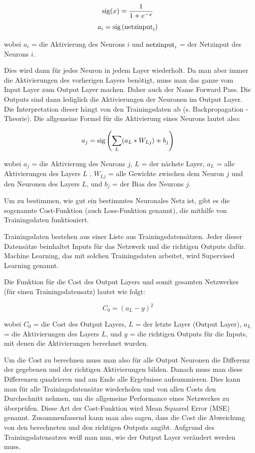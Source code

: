\documentclass{scrartcl}
\begin{document}
	{\Large
	\[
		\textrm{sig}(x)=\frac{1}{1+e^{-x}}
		\]
	\[
		a_i=\textrm{sig}\left({\textrm{netzinput}}_i \right)
		\]}
	
	wobei $a_i$ = die Aktivierung des Neurons $i$ und $\textrm{netzinput}_{i}$ = der Netzinput des Neurons $i$.

	Dies wird dann für jedes Neuron in jedem Layer wiederholt. Da man aber immer die Aktivierungen des vorherigen Layers benötigt, muss man das ganze vom Input Layer zum Output Layer machen. Daher auch der Name Forward Pass. Die Outputs sind dann lediglich die Aktivierungen der Neuronen im Output Layer. Die Interpretation dieser hängt von den Trainingsdaten ab (s. Backpropagation - Theorie). Die allgemeine Formel für die Aktivierung eines Neurons lautet also: 

	{\Large \[
		a_{j} = \textrm{sig}\left(\sum_{L} (a_{L} * W_{Lj}) + b_{j}\right)
		\]}
		
	\noindent wobei $a_j$ = die Aktivierung des Neurons $j$, $L$ = der nächste Layer, $a_L$ = alle Aktivierungen des Layers $L$ , $W_{Lj}$ = alle Gewichte zwischen dem Neuron $j$ und den Neuronen des Layers $L$, und $b_j$ = der Bias des Neurons $j$. \cite{brotcrunsher:forwardpass}
	

	Um zu bestimmen, wie gut ein bestimmtes Neuronales Netz ist, gibt es die sogenannte Cost-Funktion (auch Loss-Funktion genannt), die mithilfe von Trainingsdaten funktioniert.
	
	Trainingsdaten bestehen aus einer Liste aus Trainingsdatensätzen. Jeder dieser Datensätze beinhaltet Inputs für das Netzwerk und die richtigen Outputs dafür. Machine Learning, das mit solchen Trainingsdaten arbeitet, wird Supervised Learning genannt.

	Die Funktion für die Cost des Output Layers und somit gesamten Netzwerkes (für einen Trainingsdatensatz) lautet wie folgt:

	{\Large \[
		C_0 = (a_L - y)^2
	\]}


	\noindent wobei $C_0$ = die Cost des Output Layers, $L$ = der letzte Layer (Output Layer), $a_L$ = die Aktivierungen des Layers $L$, und $y$ = die richtigen Outputs für die Inputs, mit denen die Aktivierungen berechnet wurden. 
	
	Um die Cost zu berechnen muss man also für alle Output Neuronen die Differenz der gegebenen und der richtigen Aktivierungen bilden. Danach muss man diese Differenzen quadrieren und am Ende alle Ergebnisse aufsummieren. Dies kann man für alle Trainingsdatensätze wiederholen und von allen Costs den Durchschnitt nehmen, um die allgemeine Performance eines Netzwerkes zu überprüfen. Diese Art der Cost-Funktion wird Mean Squared Error (MSE) genannt. Zusammenfassend kann man also sagen, dass die Cost die Abweichung von den berechneten und den richtigen Outputs angibt.
	Aufgrund des Trainingsdatensatzes weiß man nun, wie der Output Layer verändert werden
	muss.
\end{document}
